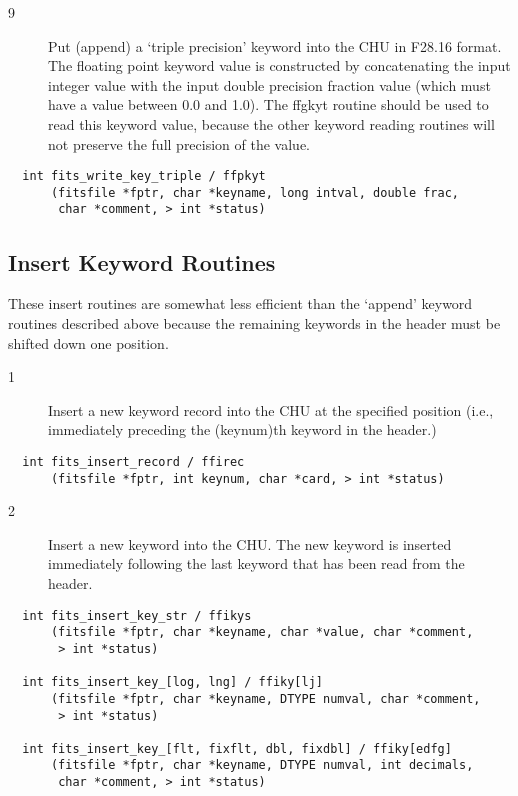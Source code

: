 \begin{description}
\item[9 ] Put (append) a `triple precision' keyword into the CHU in F28.16 format.
    The floating point keyword value is constructed by concatenating the
    input integer value with the input double precision fraction value
    (which must have a value between 0.0 and 1.0). The ffgkyt routine should
    be used to read this keyword value, because the other keyword reading
   routines will not preserve the full precision of the value.
\end{description}

\begin{verbatim}
  int fits_write_key_triple / ffpkyt
      (fitsfile *fptr, char *keyname, long intval, double frac,
       char *comment, > int *status)
\end{verbatim}

\subsection{ Insert Keyword Routines \label{FFIREC}}

These insert routines are somewhat less efficient than the `append' keyword
routines described above because the remaining keywords in the header must
be shifted down one position.


\begin{description}
\item[1 ] Insert a new keyword record into the CHU at the specified position
   (i.e., immediately preceding the (keynum)th keyword in the header.)
\end{description}

\begin{verbatim}
  int fits_insert_record / ffirec
      (fitsfile *fptr, int keynum, char *card, > int *status)
\end{verbatim}

\begin{description}
\item[2 ] Insert a new keyword into the CHU.  The new keyword is inserted
   immediately following the last keyword that has been read from the header.
\end{description}

\begin{verbatim}
  int fits_insert_key_str / ffikys
      (fitsfile *fptr, char *keyname, char *value, char *comment,
       > int *status)

  int fits_insert_key_[log, lng] / ffiky[lj]
      (fitsfile *fptr, char *keyname, DTYPE numval, char *comment,
       > int *status)

  int fits_insert_key_[flt, fixflt, dbl, fixdbl] / ffiky[edfg]
      (fitsfile *fptr, char *keyname, DTYPE numval, int decimals,
       char *comment, > int *status)
\end{verbatim}

